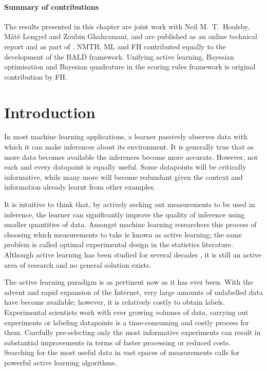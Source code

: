 
\paragraph{Summary of contributions} The results presented in this chapter are joint work with Neil M.\ T.\ Houlsby, M\'{a}t\'{e} Lengyel and Zoubin Ghahramani, and are published as an online technical report \citep{Houlsby2011} and as part of \citep{Houlsby2012preference}. NMTH, ML and FH contributed equally to the development of the BALD framework. Unifying active learning, Bayesian optimisation and Bayesian quadrature in the scoring rules framework is original contribution by FH.

\section{Introduction}

In most machine learning applications, a learner passively observes data with which it can make inferences about its environment. It is generally true that as more data becomes available the inferences become more accurate. However, not each and every datapoint is equally useful. Some datapoints will be critically informative, while many more will become redundant given the context and information already learnt from other examples.

It is intuitive to think that, by actively seeking out measurements to be used in inference, the learner can significantly improve the quality of inference using smaller quantities of data. Amongst machine learning researchers this process of choosing which measurements to take is known as active learning; the same problem is called optimal experimental design in the statistics literature. Although active learning has been studied for several decades \citep{lindley1956,jaynes1986}, it is still an active area of research and no general solution exists.

The active learning paradigm is as pertinent now as it has ever been. With the advent and rapid expansion of the Internet, very large amounts of unlabelled data have become available; however, it is relatively costly to obtain labels. Experimental scientists work with ever growing volumes of data, carrying out experiments or labeling datapoints is a time-consuming and costly process for them. Carefully pre-selecting only the most informative experiments can result in substantial improvements in terms of faster processing or reduced costs. Searching for the most useful data in vast spaces of measurements calls for powerful active learning algorithms.

